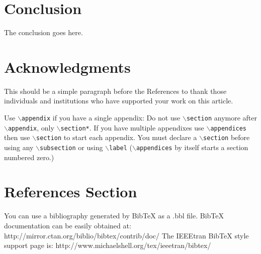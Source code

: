 \documentclass[lettersize,journal]{IEEEtran}
\begin{document}
\section{Conclusion}
The conclusion goes here.


\section*{Acknowledgments}
This should be a simple paragraph before the References to thank those individuals and institutions who have supported your work on this article.



{
Use $\backslash${\tt{appendix}} if you have a single appendix:
Do not use $\backslash${\tt{section}} anymore after $\backslash${\tt{appendix}}, only $\backslash${\tt{section*}}.
If you have multiple appendixes use $\backslash${\tt{appendices}} then use $\backslash${\tt{section}} to start each appendix.
You must declare a $\backslash${\tt{section}} before using any $\backslash${\tt{subsection}} or using $\backslash${\tt{label}} ($\backslash${\tt{appendices}} by itself
 starts a section numbered zero.)}






\section{References Section}
You can use a bibliography generated by BibTeX as a .bbl file.
 BibTeX documentation can be easily obtained at:
 http://mirror.ctan.org/biblio/bibtex/contrib/doc/
 The IEEEtran BibTeX style support page is:
 http://www.michaelshell.org/tex/ieeetran/bibtex/


 
%
%
\end{document}
